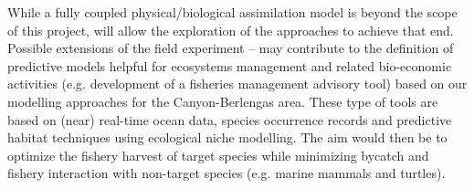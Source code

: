 While a fully coupled physical/biological assimilation model is beyond
the scope of this project, \proj will allow the exploration of the
approaches to achieve that end.  Possible extensions of the field
experiment – may contribute to the definition of predictive models
helpful for ecosystems management and related bio-economic activities
(e.g. development of a fisheries management advisory tool) based on
our modelling approaches for the \naz Canyon-Berlengas area. These
type of tools are based on (near) real-time ocean data, species
occurrence records and predictive habitat techniques using ecological
niche modelling. The aim would then be to optimize the fishery harvest
of target species while minimizing bycatch and fishery interaction
with non-target species (e.g. marine mammals and turtles).


